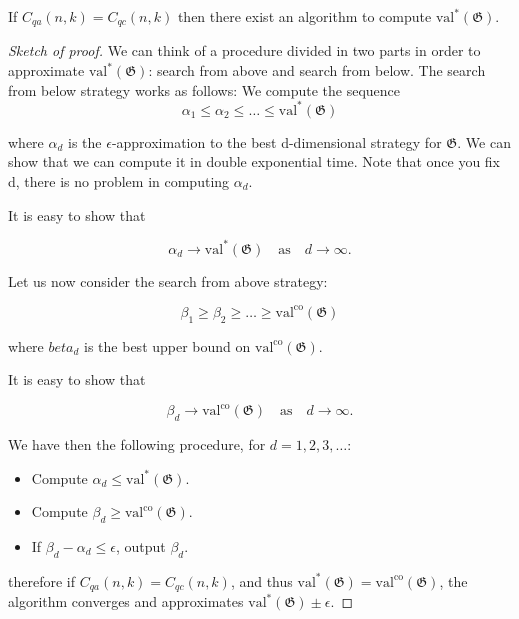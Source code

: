 \begin{theorem}\label{th:tsirelon}
If $C_{q a}(n, k) = C_{q c}(n, k)$ then there exist an algorithm to compute $\operatorname{val^{*}}(\mathfrak{G})$.
\end{theorem}
\begin{proof}[Sketch of proof]
We can think of a procedure divided in two parts in order to approximate $\operatorname{val^{*}}(\mathfrak{G})$: search from above and search from below.
The search from below strategy works as follows:
We compute the sequence 
\begin{equation}
\alpha_1 \leq \alpha_2 \leq \dots \leq \operatorname{val^{*}}(\mathfrak{G})
\end{equation}
 
where $\alpha_d$ is the $\epsilon$-approximation to the best d-dimensional strategy for $\mathfrak{G}$. We can show that we can compute it in double exponential time.
Note that once you fix d, there is no problem in computing $\alpha_d$.

It is easy to show that 

\begin{equation}
\alpha_d \rightarrow \operatorname{val^{*}}(\mathfrak{G}) \quad \text{as} \quad d \rightarrow \infty.
\end{equation}

Let us now consider the search from above strategy:

\begin{equation}
\beta_1 \geq \beta_2 \geq \dots \geq \operatorname{val^{co}}(\mathfrak{G})
\end{equation}

where $beta_d$ is the best upper bound on $\operatorname{val^{co}}(\mathfrak{G})$.

It is easy to show that 

\begin{equation}
\beta_d \rightarrow \operatorname{val^{co}}(\mathfrak{G}) \quad \text{as} \quad d \rightarrow \infty.
\end{equation}

We have then the following procedure, for $d = 1,2,3, \dots$:

\begin{itemize}
\item Compute $\alpha_d \leq \operatorname{val^{*}}(\mathfrak{G})$.
\item Compute $\beta_d \geq \operatorname{val^{co}}(\mathfrak{G})$.
\item If $\beta_d - \alpha_d \leq \epsilon$, output $\beta_d$.
\end{itemize}

therefore if $C_{q a}(n, k) = C_{q c}(n, k)$, and thus $\operatorname{val^{*}}(\mathfrak{G}) =  \operatorname{val^{co}}(\mathfrak{G})$, the algorithm converges and approximates $\operatorname{val^{*}}(\mathfrak{G}) \pm \epsilon$.
\end{proof}


